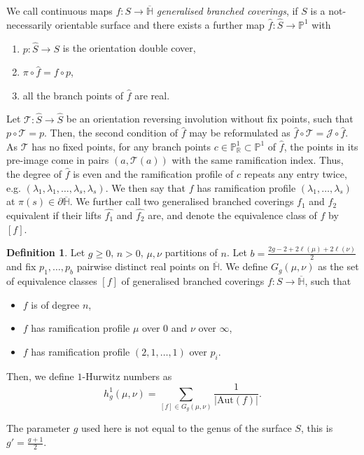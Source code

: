 \documentclass[10pt]{amsart}
\theoremstyle{plain}
\theoremstyle{definition}
\newtheorem{defi}[defi]{Definition}
\theoremstyle{definition}
\theoremstyle{plain}
\theoremstyle{plain}
\theoremstyle{remark}
\theoremstyle{plain}
\theoremstyle{plain}
\begin{document}
We call continuous maps $f\colon S\to\overline{\mathbb{H}}$ \textit{generalised branched coverings}, if $S$ is a not-necessarily orientable surface and there exists a further map $\hat{f}\colon \hat{S}\to\mathbb{P}^1$ with
    \begin{enumerate}
        \item $p\colon\hat{S}\to S$ is the orientation double cover,
        \item $\pi\circ\hat{f}=f\circ p$,
        \item all the branch points of $\hat{f}$ are real.
    \end{enumerate}
Let $\mathcal{T}\colon \hat{S}\to\hat{S}$ be an orientation reversing involution without fix points, such that $p\circ \mathcal{T}=p$. Then, the second condition of $\hat{f}$ may be reformulated as $\hat{f}\circ\mathcal{T}=\mathcal{J}\circ \hat{f}$. As $\mathcal{T}$ has no fixed points, for any branch points $c\in\mathbb{P}^1_{\mathbb{R}}\subset\mathbb{P}^1$ of $\hat{f}$, the points in its pre-image come in pairs $(a,\mathcal{T}(a))$ with the same ramification index. Thus, the degree of $\hat{f}$ is even and the ramification profile of $c$ repeats any entry twice, e.g. $(\lambda_1,\lambda_1,\dots,\lambda_s,\lambda_s)$. We then say that $f$ has ramification profile $(\lambda_1,\dots,\lambda_s)$ at $\pi(s)\in\partial\overline{\mathbb{H}}$. We further call two generalised branched coverings $f_1$ and $f_2$ equivalent if their lifts $\hat{f_1}$ and $\hat{f_2}$ are, and denote the equivalence class of $f$ by $[f]$. 

\begin{defi}\label{def-nonoriented}
    Let $g\ge0$, $n>0$, $\mu,\nu$ partitions of $n$. Let $b=\frac{2g-2+2\ell(\mu)+2\ell(\nu)}{2}$ and fix $p_1,\dots,p_b$ pairwise distinct real points on $\overline{\mathbb{H}}$. We define $G_g(\mu,\nu)$ as the set of equivalence classes $[f]$ of generalised branched coverings $f\colon S\to\overline{\mathbb{H}}$, such that
    \begin{itemize}
        \item $f$ is of degree $n$,
        \item $f$ has ramification profile $\mu$ over $0$ and $\nu$ over $\infty$,
        \item $f$ has ramification profile $(2,1,\dots,1)$ over $p_i$.
    \end{itemize}
    Then, we define $1$-Hurwitz numbers as
    \begin{equation*}
        h^1_g(\mu,\nu)=\sum_{[f]\in G_g(\mu,\nu)}\frac{1}{|\mathrm{Aut}(f)|}.
    \end{equation*}
\end{defi}
The parameter $g$ used here is not equal to the genus of the surface $S$, this is $g'=\frac{g+1}{2}.$
\end{document}
